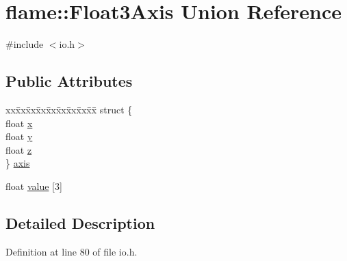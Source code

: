 \hypertarget{unionflame_1_1_float3_axis}{\section{flame\-:\-:Float3\-Axis Union Reference}
\label{unionflame_1_1_float3_axis}
}


{\ttfamily \#include $<$io.\-h$>$}

\subsection*{Public Attributes}
\begin{DoxyCompactItemize}
\item 
\begin{tabbing}
xx\=xx\=xx\=xx\=xx\=xx\=xx\=xx\=xx\=\kill
struct \{\\
\>float \hyperlink{unionflame_1_1_float3_axis_a39959853d3267a6359a2251c2a44fa52}{x}\\
\>float \hyperlink{unionflame_1_1_float3_axis_a1c0869cfab2ad84c9100036df3d189ca}{y}\\
\>float \hyperlink{unionflame_1_1_float3_axis_afa8c67d320f90af628196854ac8c7de1}{z}\\
\} \hyperlink{unionflame_1_1_float3_axis_af6f6e4f42248d576ce450a9113a8c3f2}{axis}\\

\end{tabbing}\item 
float \hyperlink{unionflame_1_1_float3_axis_a76a0b46883c1466dafa1496626ef7ab5}{value} \mbox{[}3\mbox{]}
\end{DoxyCompactItemize}


\subsection{Detailed Description}


Definition at line 80 of file io.\-h.



